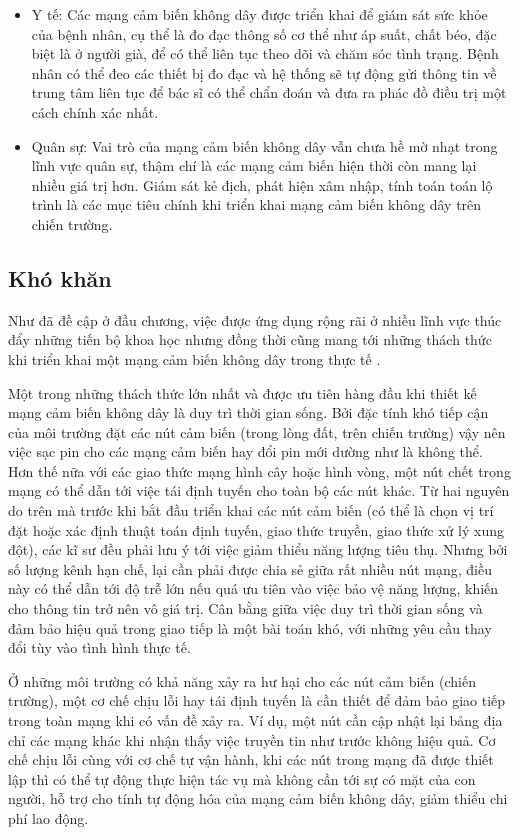 \documentclass{hust}
\begin{document}
\begin{itemize}
	\item Y tế: Các mạng cảm biến không dây được triển khai để giám sát sức khỏe của bệnh nhân, cụ thể là đo đạc thông số cơ thể như áp suất, chất béo, đặc biệt là ở người già, để có thể liên tục theo dõi và chăm sóc tình trạng. Bệnh nhân có thể đeo các thiết bị đo đạc và hệ thống sẽ tự động gửi thông tin về trung tâm liên tục để bác sĩ có thể chẩn đoán và đưa ra phác đồ điều trị một cách chính xác nhất.
	\item Quân sự: Vai trò của mạng cảm biến không dây vẫn chưa hề mờ nhạt trong lĩnh vực quân sự, thậm chí là các mạng cảm biến hiện thời còn mang lại nhiều giá trị hơn. Giám sát kẻ địch, phát hiện xâm nhập, tính toán toán lộ trình là các mục tiêu chính khi triển khai mạng cảm biến không dây trên chiến trường.
\end{itemize}

\subsection{Khó khăn}
Như đã đề cập ở đầu chương, việc được ứng dụng rộng rãi ở nhiều lĩnh vực thúc đẩy những tiến bộ khoa học nhưng đồng thời cũng mang tới những thách thức khi triển khai một mạng cảm biến không dây trong thực tế \cite{eisa2013challenges}. 


Một trong những thách thức lớn nhất và được ưu tiên hàng đầu khi thiết kế mạng cảm biến không dây là duy trì thời gian sống. Bởi đặc tính khó tiếp cận của môi trường đặt các nút cảm biến (trong lòng đất, trên chiến trường) vậy nên việc sạc pin cho các mạng cảm biến hay đổi pin mới dường như là không thể. Hơn thế nữa với các giao thức mạng hình cây hoặc hình vòng, một nút chết trong mạng có thể dẫn tới việc tái định tuyến cho toàn bộ các nút khác. Từ hai nguyên do trên mà trước khi bắt đầu triển khai các nút cảm biến (có thể là chọn vị trí đặt hoặc xác định thuật toán định tuyến, giao thức truyền, giao thức xử lý xung đột), các kĩ sư đều phải lưu ý tới việc giảm thiểu năng lượng tiêu thụ. Nhưng bởi số lượng kênh hạn chế, lại cần phải được chia sẻ giữa rất nhiều nút mạng, điều này có thể dẫn tới độ trễ lớn nếu quá ưu tiên vào việc bảo vệ năng lượng, khiến cho thông tin trở nên vô giá trị. Cân bằng giữa việc duy trì thời gian sống và đảm bảo hiệu quả trong giao tiếp là một bài toán khó, với những yêu cầu thay đổi tùy vào tình hình thực tế.


Ở những môi trường có khả năng xảy ra hư hại cho các nút cảm biến (chiến trường), một cơ chế chịu lỗi hay tái định tuyến là cần thiết để đảm bảo giao tiếp trong toàn mạng khi có vấn đề xảy ra. Ví dụ, một nút cần cập nhật lại bảng địa chỉ các mạng khác khi nhận thấy việc truyền tin như trước không hiệu quả. Cơ chế chịu lỗi cùng với cơ chế tự vận hành, khi các nút trong mạng đã được thiết lập thì có thể tự động thực hiện tác vụ mà không cần tới sự có mặt của con người, hỗ trợ cho tính tự động hóa của mạng cảm biến không dây, giảm thiểu chi phí lao động.
\end{document}
